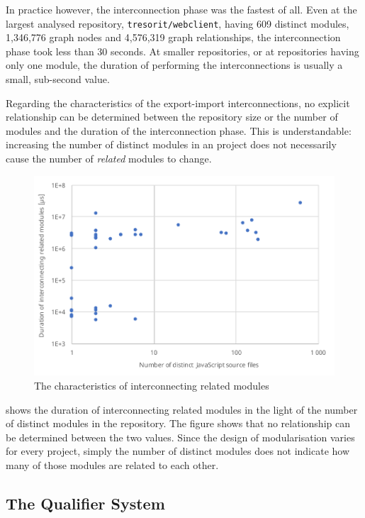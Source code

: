 In practice however, the interconnection phase was the fastest of all. Even at the largest analysed repository, \lstinline{tresorit/webclient}, having 609 distinct \es modules, 1,346,776 graph nodes and 4,576,319 graph relationships, the interconnection phase took less than 30 seconds. At smaller repositories, or at repositories having only one module, the duration of performing the interconnections is usually a small, sub-second value.

Regarding the characteristics of the export-import interconnections, no explicit relationship can be determined between the repository size or the number of modules and the duration of the interconnection phase. This is understandable: increasing the number of distinct modules in an \es project does not necessarily cause the number of \emph{related} modules to change.

\begin{figure}[!htb]
	\centerfloat
	\includegraphics[width=\textwidth,clip]{figures/measurement-interconnecttime-modules.pdf}
	\caption{The characteristics of interconnecting related modules}
	\label{fig:measurement-interconnecttime-modules}
\end{figure}

 shows the duration of interconnecting related modules in the light of the number of distinct modules in the repository. The figure shows that no relationship can be determined between the two values. Since the design of modularisation varies for every project, simply the number of distinct modules does not indicate how many of those modules are related to each other.


\subsection{The Qualifier System}

